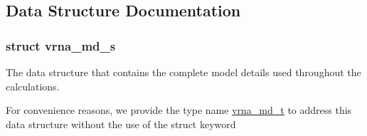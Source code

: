 \subsection{Data Structure Documentation}
\label{structvrna__md__s}
\subsubsection{struct vrna\+\_\+md\+\_\+s}
The data structure that contains the complete model details used throughout the calculations. 

For convenience reasons, we provide the type name \hyperlink{group__model__details_ga1f8a10e12a0a1915f2a4eff0b28ea17c}{vrna\+\_\+md\+\_\+t} to address this data structure without the use of the struct keyword

